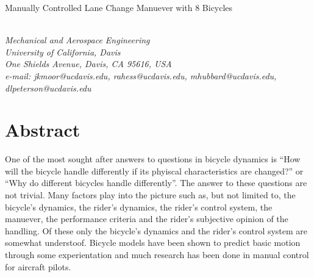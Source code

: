 \documentclass{bmd2010a}
\begin{document}
\begin{flushleft}
{\fontsize{16pt}{20pt}\selectfont%
  Manually Controlled Lane Change Manuever with 8 Bicycles\\}
\end{flushleft}

\begin{flushleft}
  {\\}
  \textit{Mechanical and Aerospace Engineering\\
          University of California, Davis\\
          One Shields Avenue, Davis, CA 95616, USA\\
          e-mail: jkmoor@ucdavis.edu, rahess@ucdavis.edu, mhubbard@ucdavis.edu,
          dlpeterson@ucdavis.edu
  }\vspace{10pt}\\
\end{flushleft}

\section*{Abstract}

One of the most sought after answers to questions in bicycle dynamics is ``How
will the bicycle handle differently if its phyiscal characteristics are
changed?'' or ``Why do different bicycles handle differently''. The answer to
these questions are not trivial. Many factors play into the picture such as,
but not limited to, the bicycle's dynamics, the rider's dynamics, the rider's
control system, the manuever, the performance criteria and the rider's
subjective opinion of the handling. Of these only the bicycle's dynamics and
the rider's control system are somewhat understoof. Bicycle models have been
shown to predict basic motion through some experientation and much research has
been done in manual control for aircraft pilots.
\end{document}
